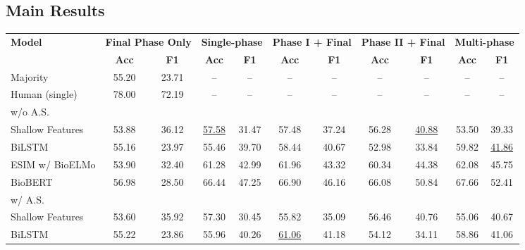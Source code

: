 \documentclass[11pt,a4paper]{article}
\begin{document}
\subsection{Main Results}
\begin{table*}
    \small
    \centering
    \begin{tabular}{lcccccccccc}
        \toprule
        \multirow{2}{*}{\textbf{Model}} & 
        \multicolumn{2}{c}{\textbf{Final Phase Only}} &
        \multicolumn{2}{c}{\textbf{Single-phase}} &
        \multicolumn{2}{c}{\textbf{Phase I + Final}} &
        \multicolumn{2}{c}{\textbf{Phase II + Final}} & 
        \multicolumn{2}{c}{\textbf{Multi-phase}} \\
        \cmidrule{2-11}
        & \textbf{Acc} & \textbf{F1} & \textbf{Acc} & \textbf{F1} & \textbf{Acc} & \textbf{F1} & \textbf{Acc} & \textbf{F1} & \textbf{Acc} & \textbf{F1} \\
        \midrule
        Majority & 55.20 & 23.71 & -- & -- & -- & -- & -- & -- & -- & -- \\
        Human (single) & 78.00 & 72.19 & -- & -- & -- & -- & -- & -- & -- & -- \\
        \midrule
        w/o A.S. \\
        \midrule
        \hspace{0.1cm}Shallow Features & 53.88 & 36.12 & \underline{57.58} & 31.47 & 57.48 & 37.24 & 56.28 & \underline{40.88} & 53.50 & 39.33 \\
        \hspace{0.1cm}BiLSTM & 55.16 & 23.97 & 55.46 & 39.70 & 58.44 & 40.67 & 52.98 & 33.84 & 59.82 & \underline{41.86} \\
        \hspace{0.1cm}ESIM w/ BioELMo & 53.90 & 32.40 & 61.28 & 42.99 & 61.96 & 43.32 & 60.34 & 44.38 & 62.08 & 45.75 \\
        \hspace{0.1cm}BioBERT & 56.98 & 28.50  & 66.44 & 47.25 & 66.90 & 46.16 & 66.08 & 50.84 & 67.66 & 52.41 \\
        \midrule
        w/ A.S. \\
        \midrule
        \hspace{0.1cm}Shallow Features & 53.60 & 35.92 & 57.30 & 30.45 & 55.82 & 35.09 & 56.46 & 40.76 & 55.06 & 40.67 \\
        \hspace{0.1cm}BiLSTM & 55.22 & 23.86 & 55.96 & 40.26 & \underline{61.06} & 41.18 & 54.12 & 34.11 & 58.86 & 41.06 \\

\end{tabular}
\end{table*}
\end{document}
